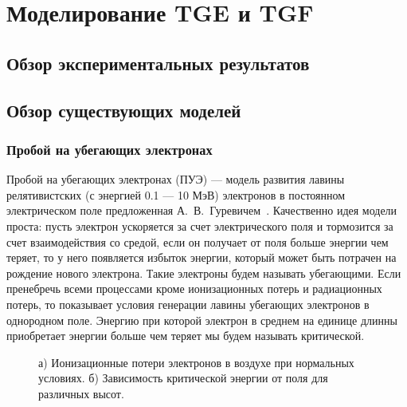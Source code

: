 \chapter{Моделирование TGE и TGF
}\label{ch:thunderstorm}

\section{Обзор экспериментальных результатов
}\label{sec:thunderstorm/review-exp}

\section{Обзор существующих моделей}\label{sec:thunderstorm/review-mod}

\subsection{Пробой на убегающих электронах}
%
Пробой на убегающих электронах (ПУЭ) --- модель развития лавины релятивистских (с энергией 0.1 --- 10 МэВ) электронов в постоянном электрическом поле предложенная А.~В.~Гуревичем~\cite{gurevich1992runaway,Gurevich2001ufn}. Качественно идея модели проста: пусть электрон ускоряется за счет электрического поля и тормозится за счет взаимодействия со средой, если он получает от поля больше энергии чем теряет, то у него появляется избыток энергии, который может быть потрачен на рождение нового электрона. Такие электроны будем называть убегающими. Если пренебречь всеми процессами кроме ионизационных потерь и радиационных потерь, то  показывает условия генерации лавины убегающих электронов в однородном поле. Энергию при которой электрон в среднем на единице длинны приобретает энергии больше чем теряет мы будем называть критической.

\begin{figure}[t]
    \begin{center}
        \begin{minipage}[h]{0.49\linewidth}
        \end{minipage}
        \hfill
        \begin{minipage}[h]{0.49\linewidth}
        \end{minipage}
        \caption{а) Ионизационные потери электронов в воздухе при нормальных условиях. б) Зависимость критической энергии от поля для различных высот.}
    \end{center}
    \label{thunder:gurevich}
\end{figure}

